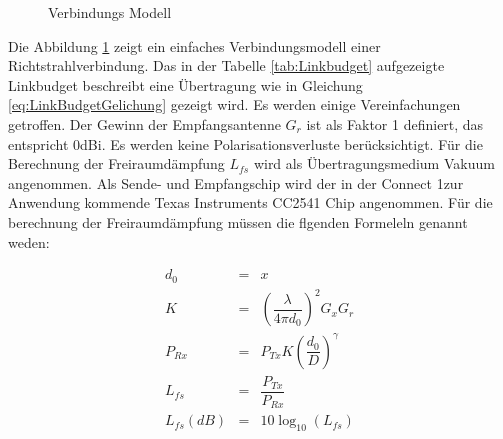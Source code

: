 \begin{figure}[h]
\begin{center}
\end{center}
\caption{Verbindungs Modell}
\label{fig:LinkModell}
\end{figure}

Die Abbildung \ref{fig:LinkModell} zeigt ein einfaches Verbindungsmodell einer Richtstrahlverbindung. Das in der Tabelle \ref{tab:Linkbudget} aufgezeigte Linkbudget beschreibt eine Übertragung wie in Gleichung \ref{eq:LinkBudgetGelichung} gezeigt wird. Es werden einige Vereinfachungen getroffen. Der Gewinn der Empfangsantenne $G_{r}$  ist als Faktor 1 definiert, das entspricht 0dBi. Es werden keine Polarisationsverluste berücksichtigt. Für die Berechnung der Freiraumdämpfung $L_{fs}$ wird als Übertragungsmedium Vakuum angenommen. Als Sende- und Empfangschip wird der in der \glqq Connect 1\grqq zur Anwendung kommende Texas Instruments CC2541 Chip angenommen. Für die berechnung der Freiraumdämpfung müssen die flgenden Formeleln genannt weden:
 
\begin{eqnarray}
    	d_{0} 	&=& x \\ \label{eq:d0_LinkBudget}
    K		&=& \left(\dfrac{\lambda}{4\pi d_{0}} \right)^{2}G_{x}G_{r} \\ \label{eq:K_LinkBudget}
    P_{Rx} 	&=& P_{Tx}K \left( \dfrac{d_{0}}{D}\right)^{\gamma} \\ \label{eq:Prx_LinkBudget}
    L_{fs} 	&=& \dfrac{P_{Tx}}{P_{Rx}} \\ \label{eq:Freiraumdaempfung}
    L_{fs}(dB) 	&=& 10\log_{10}(L_{fs}) \label{eq:Freiraumdaempfung_dB}
\end{eqnarray}

